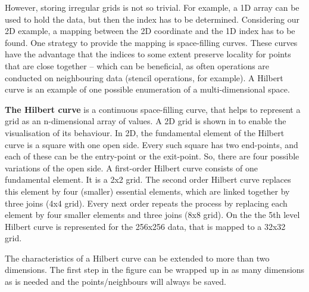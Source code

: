 However, storing irregular grids is not so trivial.
For example, a 1D array can be used to hold the data, but then the index has to be determined.
Considering our 2D example, a mapping between the 2D coordinate and the 1D index has to be found.
One strategy to provide the mapping is space-filling curves.
These curves have the advantage that the indices to some extent preserve locality for points that are close together -- which can be beneficial, as often operations are conducted on neighbouring data (stencil operations, for example).
A Hilbert curve is an example of one possible enumeration of a multi-dimensional space.

{\bf The Hilbert curve} is a continuous space-filling curve, that helps to represent a grid as an n-dimensional array of values.
A 2D grid is shown in  to enable the visualisation of its behaviour.
In 2D, the fundamental element of the Hilbert curve is a square with one open side.
Every such square has two end-points, and each of these can be the entry-point or the exit-point.
So, there are four possible variations of the open side.
A first-order Hilbert curve consists of one fundamental element.
It is a 2x2 grid.
The second order Hilbert curve replaces this element by four (smaller) essential elements, which are linked together by three joins (4x4 grid).
Every next order repeats the process by replacing each element by four smaller elements and three joins (8x8 grid).
On the  the 5th level Hilbert curve is represented for the 256x256 data, that is mapped to a 32x32 grid.

The characteristics of a Hilbert curve can be extended to more than two dimensions.
The first step in the figure can be wrapped up in as many dimensions as is needed and the points/neighbours will always be saved.


